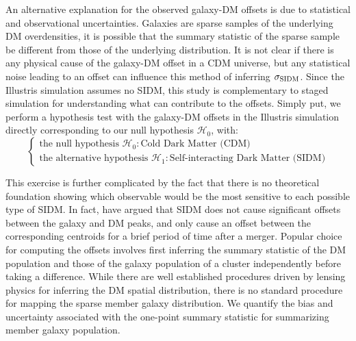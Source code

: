 An alternative explanation for the observed galaxy-DM offsets is due to 
statistical and observational uncertainties. Galaxies are
sparse samples of the underlying DM overdensities, it is possible that the 
summary statistic of the sparse sample be different from those of the 
underlying distribution. It is not clear if there is any physical
cause of the galaxy-DM offset in a CDM universe, 
but any statistical noise leading to an offset can influence this method of 
inferring $\sigma_{\rm SIDM}$. 
Since the Illustris simulation assumes no SIDM, this study is complementary to 
staged simulation for understanding what can contribute to the offsets.
Simply put, we perform a hypothesis test with the galaxy-DM offsets in
the Illustris simulation directly corresponding to our null hypothesis
$\mathcal{H}_0$, with: 
\begin{equation}
\begin{cases}
	\text{the null hypothesis }\mathcal{H}_0: \text{Cold Dark Matter (CDM)} \\
	\text{the alternative hypothesis }\mathcal{H}_1: \text{Self-interacting Dark
	Matter (SIDM)} 
\end{cases}
\end{equation}


This exercise is further complicated by the fact that there is no theoretical
foundation showing which observable would be the most sensitive to each
possible type of SIDM. In fact, \cite{Kahlhoefer14} have argued that SIDM 
does not cause
significant offsets between the galaxy and DM peaks, and only cause an offset
between the corresponding centroids for a brief period of time after a merger. 
Popular choice for computing the offsets involves first inferring the summary
statistic of the DM population and those of the galaxy population of a cluster
independently before taking a difference.
While there are well established procedures driven by lensing physics for 
inferring the DM spatial distribution, there is no standard procedure for
mapping the sparse member galaxy distribution. 
We quantify the bias and uncertainty associated with the one-point summary
statistic for summarizing member galaxy population. 

